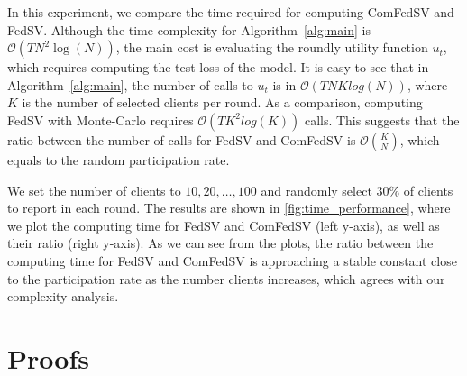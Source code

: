 In this experiment, we compare the time required for computing ComFedSV and FedSV. Although the time complexity for Algorithm~\ref{alg:main} is $\mathcal{O}(TN^2\log(N))$, the main cost is evaluating the roundly utility function $u_t$, which requires computing the test loss of the model. It is easy to see that in Algorithm~\ref{alg:main}, the number of calls to $u_t$ is in $\mathcal{O}(TNKlog(N))$, where $K$ is the number of selected clients per round. As a comparison, computing FedSV with Monte-Carlo requires $\mathcal{O}(TK^2log(K))$ calls. This suggests that the ratio between the number of calls for FedSV and ComFedSV is $\mathcal{O}(\frac{K}{N})$, which equals to the random participation rate.

We set the number of clients to $10, 20, \dots, 100$ and randomly select $30\%$ of clients to report in each round. The results are shown in \autoref{fig:time_performance}, where we plot the computing time for FedSV and ComFedSV (left y-axis), as well as their ratio (right y-axis). As we can see from the plots, the ratio between the computing time for FedSV and ComFedSV is approaching a stable constant close to the participation rate as the number clients increases, which agrees with our complexity analysis.




\section{Proofs}

